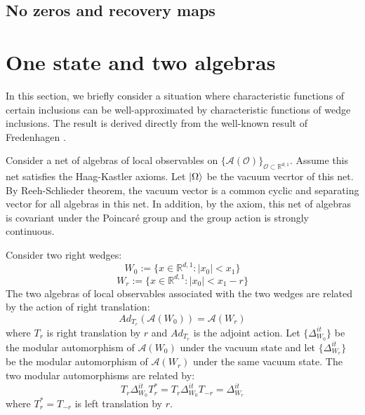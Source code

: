 \documentclass[a4paper,11pt]{article}
\theoremstyle{definition}
\begin{document}
\subsection{No zeros and recovery maps}

\section{One state and two algebras}
In this section, we briefly consider a situation where characteristic functions of certain inclusions can be well-approximated by characteristic functions of wedge inclusions. The result is derived directly from the well-known result of Fredenhagen \cite{fredenhagen}.

Consider a net of algebras of local observables on $\{\mathcal{A}(\mathcal{O})\}_{\mathcal{O}\subset\mathbb{R}^{d,1}}$. Assume this net satisfies the Haag-Kastler axioms. Let $\ket{\Omega}$ be the vacuum vecrtor of this net. By Reeh-Schlieder theorem, the vacuum vector is a common cyclic and separating vector for all algebras in this net. In addition, by the axiom, this net of algebras is covariant under the Poincaré group and the group action is strongly continuous.

Consider two right wedges:
\begin{equation}
    W_0 := \{x\in\mathbb{R}^{d,1}: |x_0| < x_1\}
\end{equation}
\begin{equation}
    W_{r} := \{x\in\mathbb{R}^{d,1}: |x_0 | < x_1 - r \}
\end{equation}
The two algebras of local observables associated with the two wedges are related by the action of right translation:
\begin{equation}
    Ad_{T_r}(\mathcal{A}(W_0)) = \mathcal{A}(W_r)
\end{equation}
where $T_r$ is right translation by $r$ and $Ad_{T_r}$ is the adjoint action. Let $\{\Delta_{W_0}^{it}\}$ be the modular automorphism of $\mathcal{A}(W_0)$ under the vacuum state and let $\{\Delta_{W_r}^{it}\}$ be the modular automorphism of $\mathcal{A}(W_r)$ under the same vacuum state. The two modular automorphisms are related by:
\begin{equation}
    T_r\Delta_{W_0}^{it}T_r^* = T_r\Delta_{W_0}^{it}T_{-r} = \Delta^{it}_{W_r}
\end{equation}
where $T_r^* = T_{-r}$ is left translation by $r$.
\end{document}
